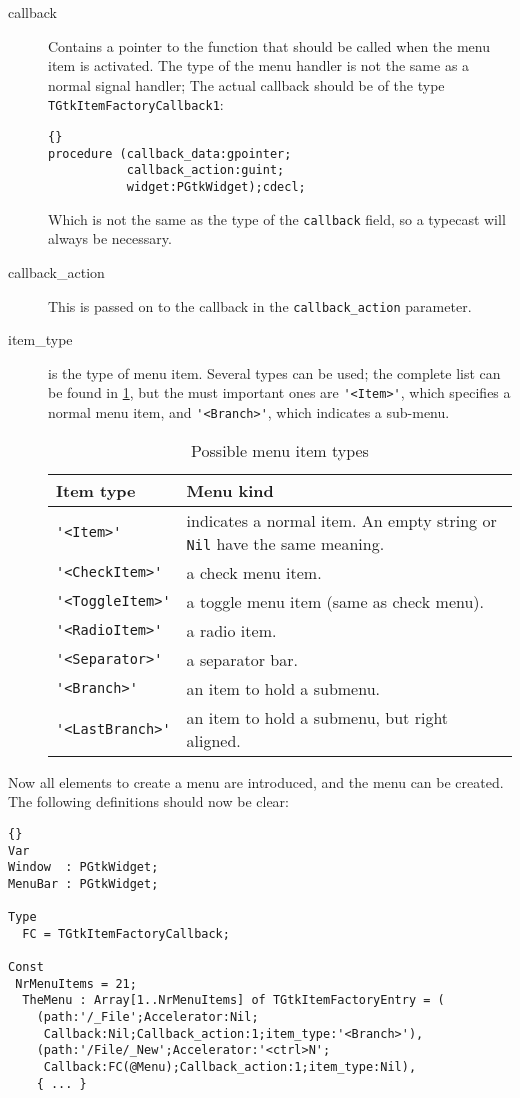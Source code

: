 \documentclass[10pt]{article}
\begin{document}
\begin{description}
\item[callback] Contains a pointer to the function that should be called
when the menu item is activated. The type of the menu handler is not the 
same as a normal signal handler; The actual callback should be of the type
\lstinline|TGtkItemFactoryCallback1|:
\begin{lstlisting}{}
procedure (callback_data:gpointer; 
           callback_action:guint; 
           widget:PGtkWidget);cdecl;
\end{lstlisting}
Which is not the same as the type of the \lstinline|callback| field, so
a typecast will always be necessary.

\item[callback\_action] This is passed on to the callback in the
\lstinline|callback_action| parameter.

\item[item\_type] is the type of menu item. Several types can be used; the
complete list can be found in \ref{tab:menutypes}, but the must important
ones are \lstinline|'<Item>'|, which specifies a normal menu item, 
 and \lstinline|'<Branch>'|, which indicates a sub-menu.
\begin{table}[ht]
\begin{center}
\caption{Possible menu item types}\label{tab:menutypes}
\begin{tabularx}{\textwidth}{lX}%
Item type & Menu kind \\ \hline
\lstinline|'<Item>'| & indicates a normal item. An empty string or \lstinline|Nil|
have the same meaning. \\
\lstinline|'<CheckItem>'| & a check menu item. \\
\lstinline|'<ToggleItem>'| & a toggle menu item (same as check menu). \\
\lstinline|'<RadioItem>'| & a radio item. \\
\lstinline|'<Separator>'| & a separator bar. \\
\lstinline|'<Branch>'| & an item to hold a submenu.\\
\lstinline|'<LastBranch>'| & an item to hold a submenu, but right aligned.\\ \hline
\end{tabularx}
\end{center}
\end{table}
\end{description}
Now all elements to create a menu are introduced, and the menu can be
created. The following definitions should now be clear:
\begin{lstlisting}{}
Var
Window  : PGtkWidget;
MenuBar : PGtkWidget;

Type
  FC = TGtkItemFactoryCallback;

Const
 NrMenuItems = 21;
  TheMenu : Array[1..NrMenuItems] of TGtkItemFactoryEntry = (
    (path:'/_File';Accelerator:Nil;
     Callback:Nil;Callback_action:1;item_type:'<Branch>'),
    (path:'/File/_New';Accelerator:'<ctrl>N';
     Callback:FC(@Menu);Callback_action:1;item_type:Nil),
    { ... }
\end{lstlisting}
\end{document}
